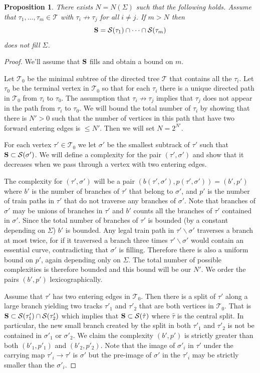 \documentclass[11pt]{article}
\newtheorem{prop}[thm]{Proposition}
\theoremstyle{remark}
\def\S{{\mathcal S}}
\def\T{{\mathcal T}}
\newcommand{\bS}{{\bf S}}
\begin{document}
\begin{prop}\label{intersection_small}
There exists $N = N(\Sigma)$ such that the following holds. Assume that $\tau_1, \dots, \tau_m \in \T$ with $\tau_i \not\to \tau_j$ for all $i\neq j$. If $m > N$ then
$$\bS = \S(\tau_1) \cap \cdots \cap\S(\tau_m)$$
does not fill $\Sigma$.
\end{prop}


\begin{proof}
 We'll assume that $\bS$ fills and obtain a bound on $m$.
 
Let $\T_0$ be the minimal subtree of the directed tree $\T$ that contains all the $\tau_i$. Let $\tau_0$ be the terminal vertex in $\T_0$ so that for each $\tau_i$ there is a unique directed path in $\T_0$ from $\tau_i$ to $\tau_0$. The assumption that $\tau_i \not\to \tau_j$ implies that $\tau_j$ does not appear in the path from $\tau_i$ to $\tau_0$. We will bound the total number of $\tau_i$ by showing that there is $N'>0$ such that the number of vertices in this path that have two forward entering edges is $\le N'$. Then we will set $N = 2^{N'}$.

   For each vertex $\tau' \in \T_0$ we let $\sigma'$ be the smallest subtrack of $\tau'$ such that $\bS\subset \S(\sigma')$. We will define a complexity for the pair $(\tau', \sigma')$ and show that it decreases when we pass through a vertex with two entering edges.

    The complexity for $(\tau', \sigma')$ will be a pair $(b(\tau', \sigma'),p(\tau', \sigma')) = (b', p')$ where $b'$ is the number of branches of $\tau'$
  that belong to $\sigma'$, and $p'$ is the number of
  train paths in $\tau'$ that do not traverse any branches of
  $\sigma'$. Note that branches of $\sigma'$ may be unions of branches in $\tau'$  
  and $b'$ counts all the branches of $\tau'$ contained in $\sigma'$. Since the total number of branches of $\tau'$ is bounded (by a constant depending on $\Sigma$) $b'$ is bounded. Any legal train path in $\tau'\smallsetminus \sigma'$ traverses a branch at most twice, for if it traversed a branch three times $\tau'\smallsetminus \sigma'$ would contain an essential curve, contradicting that $\sigma'$ is filling. Therefore there is also a uniform bound on $p'$, again depending only on $\Sigma$. The total number of possible complexities is therefore bounded and this bound will be our $N'$. We order the pairs $(b',p')$ lexicographically.

  Assume that $\tau'$ has two entering edges in $\T_0$. Then there is a split of $\tau'$ along a large branch yielding two tracks $\tau'_1$ and $\tau'_2$ that are both vertices in $\T_0$. That is $\bS\subset \S(\tau'_1) \cap \S(\tau'_2)$ which implies that $\bS \subset \S(\hat\tau)$ where  $\hat\tau$ is the central split. In particular, the new small branch created by the split in both $\tau'_1$ and $\tau'_2$ is not be contained in $\sigma'_1$ or $\sigma'_2$.
We claim the complexity $(b', p')$ is strictly greater than both $(b'_1,p'_1)$ and $(b'_2, p'_2)$. Note that the image of $\sigma'_i$ in $\tau'$ under the carrying map $\tau'_i \to \tau'$ is $\sigma'$ but the pre-image of $\sigma'$ in the $\tau'_i$ may be strictly smaller than the $\sigma'_i$.


\end{proof}
\end{document}
